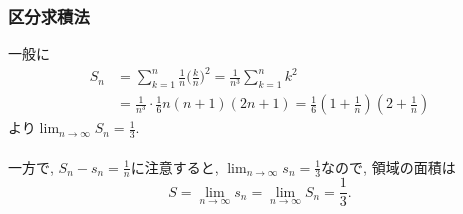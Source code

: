 \begin{frame}
\frametitle{区分求積法}

一般に
\begin{align*}
S_n &= \sum_{k=1}^n  \frac{1}{n} \big(\frac{k}{n}\big)^2 = \frac{1}{n^3}  \sum_{k=1}^n k^2 \\
& =  \frac{1}{n^3} \cdot  \frac{1}{6}n(n+1)(2n+1) = \frac{1}{6} (1+\frac{1}{n})(2+\frac{1}{n})
\end{align*}
より$\displaystyle \lim_{n\to \infty}S_n=\frac{1}{3}$. \\
\ \\

一方で, $S_n-s_n=\frac{1}{n}$に注意すると, $\displaystyle \lim_{n\to \infty}s_n=\frac{1}{3}$なので, 
領域の面積は
$$
S= \lim_{n\to \infty}s_n=\lim_{n\to \infty}S_n=\frac{1}{3}.
$$ 

\end{frame}



%
%
%


